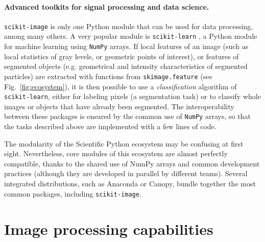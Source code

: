 \documentclass[twocolumn]{bmcart}%
\begin{document}
\paragraph{Advanced toolkits for signal processing and data science.}

\texttt{scikit-image} is only one Python module that can be used for data
processing, among many others. A very popular module is
\texttt{scikit-learn} \citep{Pedregosa2011}, a Python module for machine
learning using \texttt{NumPy} arrays. If local features of an image
(such as local statistics of gray levels, or geometric points of
interest), or features of segmented objects (e.g. geometrical and
intensity characteristics of segmented particles) are extracted with
functions from \texttt{skimage.feature} (see Fig.~\ref{fig:ecosystem}), it
is then possible to use a \emph{classification} algorithm of
\texttt{scikit-learn}, either for labeling pixels (a segmentation task)
or to classify whole images or objects that have already been segmented.
The interoperability between these packages is ensured by the common use
of \texttt{NumPy} arrays, so that the tasks described above are
implemented with a few lines of code.

The modularity of the Scientific Python ecosystem may be
confusing at first sight. Nevertheless, core modules of this ecosystem
are almost perfectly compatible, thanks to the shared use of NumPy arrays
and common development practices (although they are developed in parallel
by different teams). Several integrated distributions, such as Anaconda
or Canopy, bundle together the most common packages, including
\texttt{scikit-image}.


\section*{Image processing capabilities}
\end{document}
